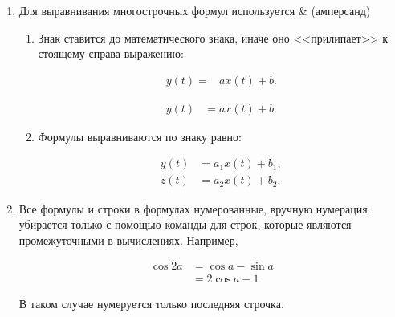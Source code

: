 \documentclass[12pt, a4paper]{article}
\begin{document}
\begin{enumerate}
	\item Для выравнивания многострочных формул используется \& (амперсанд)
	\begin{enumerate}
		\item Знак ставится до математического знака, иначе оно <<прилипает>> к стоящему справа выражению:
		
		\begin{minipage}{\linewidth}
\begin{example}
	\begin{align}
		y(t) = & ax(t) + b. %
	\end{align}
\end{example}%
\vspace{-3em}%
\begin{example}
	\begin{align}
		y(t) & = ax(t) + b.
	\end{align}
\end{example}
		\end{minipage}
		
		\item Формулы выравниваются по знаку равно:
		
		\begin{minipage}{\linewidth}
\begin{example}
	\begin{align}
		y(t) & = a_1 x(t) + b_1,
		\\
		z(t) & = a_2 x(t) + b_2.
	\end{align}
\end{example}
		\end{minipage}	
	\end{enumerate}
	\item Все формулы и строки в формулах нумерованные, вручную нумерация убирается только с помощью команды \nonumber для строк, которые являются промежуточными в вычислениях. Например, 
\begin{example}
\begin{align}
	\cos 2a & = \cos a - \sin a \nonumber \\
		& = 2\cos a - 1
\end{align}
\end{example}
	В таком случае нумеруется только последняя строчка.

\end{enumerate}

%
%
%
%
%
%
%
\end{document}
